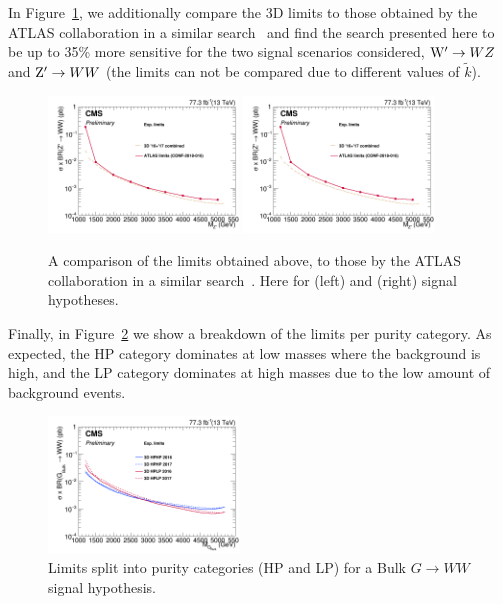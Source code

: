 In Figure~\ref{fig:limitsCompareATLAS}, we additionally compare the 3D limits to those obtained by the ATLAS collaboration in a similar search~\cite{ATLAS-CONF-2018-016} and find the search presented here to be up to 35\% more sensitive for the two signal scenarios considered, $\mathrm{W}^\prime\rightarrow WZ$ and $\mathrm{Z}^\prime\rightarrow WW$ (the \BulkG limits can not be compared due to different values of $\tilde{k}$).
\begin{figure}[h!]
\centering
\includegraphics[width=0.45\textwidth]{figures/analysis/search3/AN-17-303/limits/limits_WprimeWZ_compare_ATLAS.png}
\includegraphics[width=0.45\textwidth]{figures/analysis/search3/AN-17-303/limits/limits_ZprimeWW_compare_ATLAS.png}
\caption{A comparison of the limits obtained above, to those by the ATLAS collaboration in a similar search~\cite{ATLAS-CONF-2018-016}. Here for \PWpr (left) and \PZpr (right) signal hypotheses.}
\label{fig:limitsCompareATLAS}
\end{figure}
Finally, in Figure~\ref{fig:limitsPerCat} we show a breakdown of the limits per purity category. As expected, the HP category dominates at low masses where the background is high, and the LP category dominates at high masses due to the low amount of background events.
\begin{figure}[h!]
\centering
\includegraphics[width=0.45\textwidth]{figures/analysis/search3/AN-17-303/limits/limit_compare_BulkGWW_per_category.png}
\caption{Limits split into purity categories (HP and LP) for a Bulk $G\rightarrow WW$ signal hypothesis.}
\label{fig:limitsPerCat}
\end{figure}

